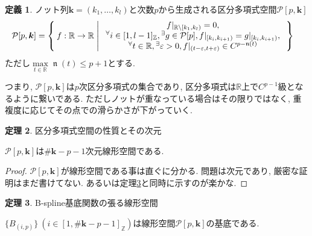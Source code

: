 \documentclass{jsarticle}
\newcommand\setR{\mathbb{R}}
\newcommand\subknot[1]{{#1}^*}
\newcommand\curl[1]{\{#1\}}
\newcommand\squa[1]{[#1]}
\newcommand\E[1]{\!\,{\vphantom{#1}}^\exists #1}
\newcommand\A[1]{\!\,{\vphantom{#1}}^\forall #1}
\newcommand\Z[2]{\squa{#1,#2}_\mathbb{Z}}
\DeclareMathOperator{\N}{\mathfrak{n}}
\theoremstyle{definition}%
\newtheorem{thm}{定理}
\newtheorem{defn}[thm]{定義}
\newcommand\UC{\textcolor{red}{(執筆中です)}}
\begin{document}
\begin{screen}
	\begin{defn}
        \label{Def305}
		ノット列$\bm{k}=(k_1,\dots,k_l)$と次数$p$から生成される区分多項式空間$\mathcal{P}[p, \bm{k}]$
		\begin{align}
			\mathcal{P}[p, \bm{k}]
			&=\Set{
				f:\setR\to\setR |
				\begin{array}{c}
					f|_{\mathbb{R}\backslash[k_1,k_l)}=0, \\
					\A i\in\Z{1}{l-1}, \E g\in \mathcal{P}[p], f|_{[k_{i},k_{i+1})}=g|_{[k_{i},k_{i+1})}, \\
					\A t\in\setR, \E \varepsilon>0, f|_{(t-\varepsilon,t+\varepsilon)}\in C^{p-\N(t)}
				\end{array}
			}
		\end{align}
		ただし$\max\limits_{t\in\setR}\N(t)\le p+1$とする.
	\end{defn}
\end{screen}
つまり, $\mathcal{P}[p, \bm{k}]$は$p$次区分多項式の集合であり, 区分多項式は$\mathbb{R}$上で$C^{p-1}$級となるように繋いである.
ただしノットが重なっている場合はその限りではなく, 重複度に応じてその点での滑らかさが下がっていく.


\begin{screen}
	\begin{thm}
		\label{Thm308}
		区分多項式空間の性質とその次元

		$\mathcal{P}[p, \bm{k}]$は$\#{\bm{k}}-p-1$次元線形空間である.
	\end{thm}
\end{screen}

\begin{proof}
	$\mathcal{P}[p, \bm{k}]$が線形空間である事は直ぐに分かる.
    問題は次元であり, 厳密な証明はまだ書けてない.
    あるいは定理\ref{Thm309}と同時に示すのが楽かな.
\end{proof}

\begin{screen}
	\begin{thm}
        \label{Thm309}
		B-spline基底関数の張る線形空間

		$\curl{B_{(i,p)}} \ (i\in \Z{1}{\#{\bm{k}}-p-1})$は線形空間$\mathcal{P}[p, \bm{k}]$の基底である.
	\end{thm}
\end{screen}
\end{document}
